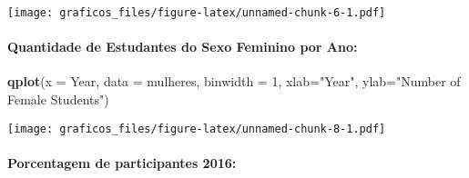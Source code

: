\documentclass[
]{article}
\newenvironment{Shaded}{\begin{snugshade}}{\end{snugshade}}
\newcommand{\DataTypeTok}[1]{\textcolor[rgb]{0.13,0.29,0.53}{#1}}
\newcommand{\DecValTok}[1]{\textcolor[rgb]{0.00,0.00,0.81}{#1}}
\newcommand{\KeywordTok}[1]{\textcolor[rgb]{0.13,0.29,0.53}{\textbf{#1}}}
\newcommand{\NormalTok}[1]{#1}
\newcommand{\OperatorTok}[1]{\textcolor[rgb]{0.81,0.36,0.00}{\textbf{#1}}}
\newcommand{\StringTok}[1]{\textcolor[rgb]{0.31,0.60,0.02}{#1}}
\begin{document}
\texttt{[image: graficos\_files/figure-latex/unnamed-chunk-6-1.pdf]}

\hypertarget{quantidade-de-estudantes-do-sexo-feminino-por-ano}{%
\paragraph{Quantidade de Estudantes do Sexo Feminino por
Ano:}\label{quantidade-de-estudantes-do-sexo-feminino-por-ano}}

\begin{Shaded}
\end{Shaded}

\begin{Shaded}
\begin{Highlighting}[]
\KeywordTok{qplot}\NormalTok{(}\DataTypeTok{x =}\NormalTok{ Year, }\DataTypeTok{data =}\NormalTok{ mulheres, }\DataTypeTok{binwidth =} \DecValTok{1}\NormalTok{, }\DataTypeTok{xlab=}\StringTok{"Year"}\NormalTok{, }\DataTypeTok{ylab=}\StringTok{"Number of Female Students"}\NormalTok{)}
\end{Highlighting}
\end{Shaded}

\texttt{[image: graficos\_files/figure-latex/unnamed-chunk-8-1.pdf]}

\hypertarget{porcentagem-de-participantes-2016}{%
\paragraph{Porcentagem de participantes
2016:}\label{porcentagem-de-participantes-2016}}

\begin{Shaded}
\end{Shaded}
\end{document}
